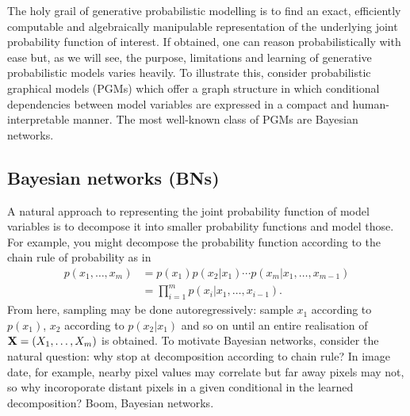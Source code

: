 \documentclass[11pt]{article}
\begin{document}
The holy grail of generative probabilistic modelling is to find an exact, efficiently computable and algebraically manipulable representation of the underlying joint probability function of interest. If obtained, one can reason probabilistically with ease but, as we will see, the purpose, limitations and learning of generative probabilistic models varies heavily. To illustrate this, consider probabilistic graphical models (PGMs) which offer a graph structure in which conditional dependencies between model variables are expressed in a compact and human-interpretable manner. The most well-known class of PGMs are Bayesian networks.

\subsection{\IMPROVE Bayesian networks (BNs)}
A natural approach to representing the joint probability function of model variables is to decompose it into smaller probability functions and model those. For example, you might decompose the probability function according to the chain rule of probability as in
\begin{align*}
    p(x_1,\dots,x_m)
    &=
    p(x_1)p(x_2|x_1)\cdots p(x_m|x_1,\dots,x_{m-1})\\
    &=
    \prod_{i=1}^m p(x_i|x_1,\dots,x_{i-1}).
\end{align*}
From here, sampling may be done autoregressively: sample $x_1$ according to $p(x_1)$, $x_2$ according to $p(x_2|x_1)$ and so on until an entire realisation of $\mathbf{X}=(X_1,\dots,X_m)$ is obtained. To motivate Bayesian networks, consider the natural question: why stop at decomposition according to chain rule? In image date, for example, nearby pixel values may correlate but far away pixels may not, so why incoroporate distant pixels in a given conditional in the learned decomposition? Boom, Bayesian networks.
\end{document}
